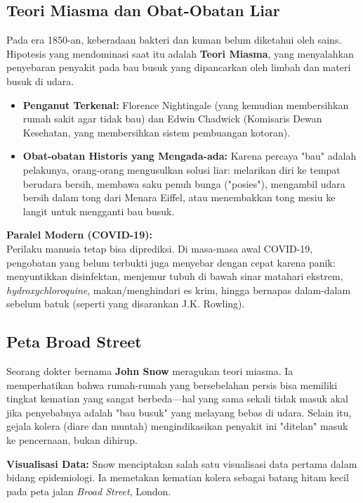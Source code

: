 \documentclass[12pt,a4paper]{article}
\begin{document}
\subsection{Teori Miasma dan Obat-Obatan Liar}
Pada era 1850-an, keberadaan bakteri dan kuman belum diketahui oleh sains. Hipotesis yang mendominasi saat itu adalah \textbf{Teori Miasma}, yang menyalahkan penyebaran penyakit pada bau busuk yang dipancarkan oleh limbah dan materi busuk di udara.
\begin{itemize}
    \item \textbf{Penganut Terkenal:} Florence Nightingale (yang kemudian membersihkan rumah sakit agar tidak bau) dan Edwin Chadwick (Komisaris Dewan Kesehatan, yang membersihkan sistem pembuangan kotoran).
    \item \textbf{Obat-obatan Historis yang Mengada-ada:} Karena percaya "bau" adalah pelakunya, orang-orang mengusulkan solusi liar: melarikan diri ke tempat berudara bersih, membawa saku penuh bunga ("posies"), mengambil udara bersih dalam tong dari Menara Eiffel, atau menembakkan tong mesiu ke langit untuk mengganti bau busuk.
\end{itemize}

\begin{tipbox}
\textbf{Paralel Modern (COVID-19):}\\
Perilaku manusia tetap bisa diprediksi. Di masa-masa awal COVID-19, pengobatan yang belum terbukti juga menyebar dengan cepat karena panik: menyuntikkan disinfektan, menjemur tubuh di bawah sinar matahari ekstrem, \textit{hydroxychloroquine}, makan/menghindari es krim, hingga bernapas dalam-dalam sebelum batuk (seperti yang disarankan J.K. Rowling).
\end{tipbox}

\subsection{Peta Broad Street}
Seorang dokter bernama \textbf{John Snow} meragukan teori miasma. Ia memperhatikan bahwa rumah-rumah yang bersebelahan persis bisa memiliki tingkat kematian yang sangat berbeda—hal yang sama sekali tidak masuk akal jika penyebabnya adalah "bau busuk" yang melayang bebas di udara. Selain itu, gejala kolera (diare dan muntah) mengindikasikan penyakit ini "ditelan" masuk ke pencernaan, bukan dihirup.

\textbf{Visualisasi Data:} Snow menciptakan salah satu visualisasi data pertama dalam bidang epidemiologi. Ia memetakan kematian kolera sebagai batang hitam kecil pada peta jalan \textit{Broad Street}, London.
\end{document}

